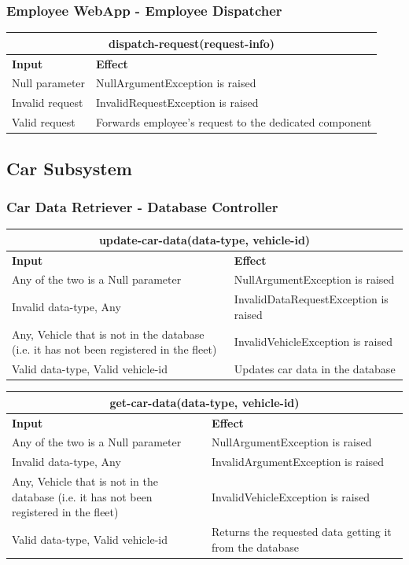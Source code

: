 \documentclass{article}
\begin{document}
\subsubsection{Employee WebApp - Employee Dispatcher}
\begin{tabular}{ |p{5cm}|p{7cm}| }
  \hline
  \multicolumn{2}{|c|}{dispatch-request(request-info)} \\
  \hline
  \textbf{Input} & \textbf{Effect} \\
  \hline
  Null parameter & NullArgumentException is raised\\
  \hline
  Invalid request & InvalidRequestException is raised \\
  \hline
  Valid request & Forwards employee's request to the dedicated component\\
  \hline
\end{tabular}
\subsection{Car Subsystem}
\subsubsection{Car Data Retriever - Database Controller}
\begin{tabular}{ |p{5cm}|p{7cm}| }
  \hline
  \multicolumn{2}{|c|}{update-car-data(data-type, vehicle-id)} \\
  \hline
  \textbf{Input} & \textbf{Effect} \\
  \hline
  Any of the two is a Null parameter & NullArgumentException is raised\\
  \hline
  Invalid data-type, Any & InvalidDataRequestException is raised\\
  \hline
  Any, Vehicle that is not in the database (i.e. it has not been registered in the fleet) & InvalidVehicleException is raised\\
  \hline
   Valid data-type, Valid vehicle-id & Updates car data in the database\\
  \hline
\end{tabular}
\newline
\begin{tabular}{ |p{5cm}|p{7cm}| }
  \hline
  \multicolumn{2}{|c|}{get-car-data(data-type, vehicle-id)} \\
  \hline
  \textbf{Input} & \textbf{Effect} \\
  \hline
  Any of the two is a Null parameter & NullArgumentException is raised\\
  \hline
  Invalid data-type, Any & InvalidArgumentException is raised\\
  \hline
  Any, Vehicle that is not in the database (i.e. it has not been registered in the fleet) & InvalidVehicleException is raised\\
  \hline
   Valid data-type, Valid vehicle-id & Returns the requested data getting it from the database\\
  \hline
\end{tabular}
\end{document}
